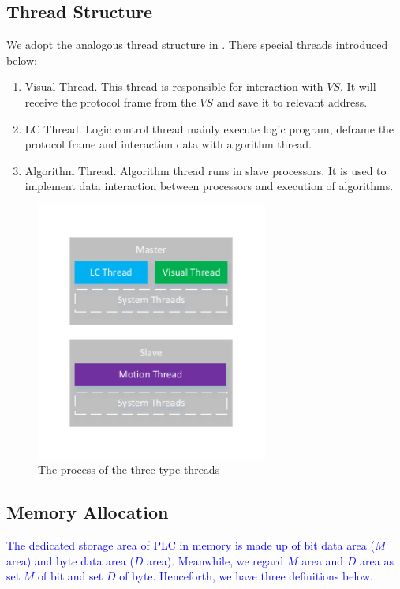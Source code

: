 \documentclass[journal,UTF8]{IEEEtran}
\begin{document}
\subsection{Thread Structure}
We adopt the analogous thread structure in \cite{wu2018customized}. There special threads introduced below:
\begin{enumerate}
	\item Visual Thread. This thread is responsible for interaction with $VS$. It will receive the protocol frame from the $VS$ and save it to relevant address. 
	\item LC Thread. Logic control thread mainly execute logic program, deframe the protocol frame and interaction data with algorithm thread.
	\item Algorithm Thread. Algorithm thread runs in slave processors. It is used to implement data interaction between processors and execution of algorithms.
\end{enumerate}



\begin{figure}
	\centering
	\includegraphics[width=3in]{fig/Threads.pdf}
	\caption{ The process of the three type threads}
	\label{fig:Threads}
\end{figure}
\subsection{Memory Allocation}
\textcolor{blue}{The dedicated storage area of PLC in memory is made up of bit data area ($M$ area) and byte data area ($D$ area). Meanwhile, we regard $M$ area and $D$ area as set $M$ of bit and set $D$ of byte. Henceforth, we have three definitions below.}
\end{document}
